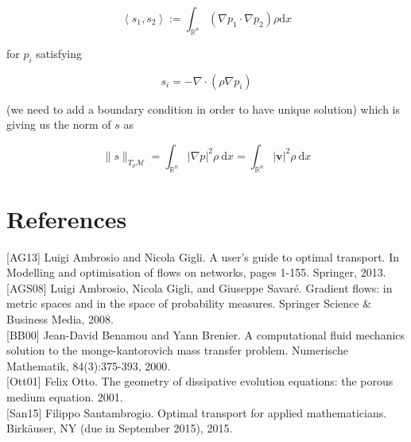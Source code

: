 \documentclass[10pt]{article}
\begin{document}
\[
\left\langle s_{1}, s_{2}\right\rangle:=\int_{\mathbb{R}^{n}}\left(\nabla p_{1} \cdot \nabla p_{2}\right) \rho \mathrm{d} x
\]

for \(p_{i}\) satisfying

\[
s_{i}=-\nabla \cdot\left(\rho \nabla p_{i}\right)
\]

(we need to add a boundary condition in order to have unique solution) which is giving us the norm of \(s\) as

\[
\|s\|_{T_{\rho} \mathcal{M}}=\int_{\mathbb{R}^{n}}|\nabla p|^{2} \rho \mathrm{~d} x=\int_{\mathbb{R}^{n}}|\mathbf{v}|^{2} \rho \mathrm{~d} x
\]

\section*{References}
[AG13] Luigi Ambrosio and Nicola Gigli. A user's guide to optimal transport. In Modelling and optimisation of flows on networks, pages 1-155. Springer, 2013.\\[0pt]
[AGS08] Luigi Ambrosio, Nicola Gigli, and Giuseppe Savaré. Gradient flows: in metric spaces and in the space of probability measures. Springer Science \& Business Media, 2008.\\[0pt]
[BB00] Jean-David Benamou and Yann Brenier. A computational fluid mechanics solution to the monge-kantorovich mass transfer problem. Numerische Mathematik, 84(3):375-393, 2000.\\[0pt]
[Ott01] Felix Otto. The geometry of dissipative evolution equations: the porous medium equation. 2001.\\[0pt]
[San15] Filippo Santambrogio. Optimal transport for applied mathematicians. Birkäuser, NY (due in September 2015), 2015.
\end{document}
